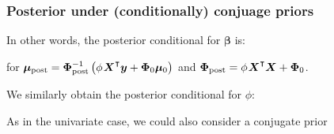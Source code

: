 \documentclass[18pt]{beamer}
\newcommand{\defineTightItemizeSpacing}{%
	\setlength{\abovedisplayskip}{.25\baselineskip}%
	\setlength{\belowdisplayskip}{.25\baselineskip}%
}
\newenvironment{tightEquation*}{%
	\defineTightItemizeSpacing%
	\begin{equation*}
}{
	\end{equation*} \ignorespacesafterend
}
\newcommand{\given}{\thinnerspace | \thinnerspace}
\newcommand{\transpose}{\text{\raisebox{.5ex}{$\intercal$}}}
\newcommand{\thinnerspace}{\mskip.5\thinmuskip}
\newcommand{\normalDist}{\mathcal{N}}
\newcommand{\gammaDist}{\mathrm{Gamma}}
\newcommand{\bX}{\bm{X}}
\newcommand{\bmu}{\bm{\mu}}
\newcommand{\bbeta}{\bm{\beta}}
\newcommand{\bPhi}{\bm{\Phi}}
\begin{document}
\begin{frame}
\frametitle{Posterior under (conditionally) conjuage priors}

In other words, the posterior conditional for $\bbeta$ is:
for $\bmu_{\textrm{post}} = \bPhi_{\textrm{post}}^{-1} \left( \phi \thinnerspace \bX^\transpose \bm{y} + \bPhi_0 \bmu_0 \right)$ and $\bPhi_{\textrm{post}} = \phi \thinnerspace \bX^\transpose \bX + \bPhi_0$.

\pause
\medskip
We similarly obtain the posterior conditional for $\phi$:

\pause
As in the univariate case, we could also consider a conjugate prior
\end{frame}
\end{document}
